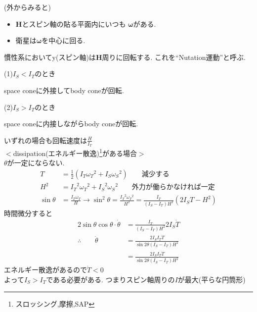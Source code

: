 \documentclass[class=article, crop=false, dvipdfmx]{standalone}
\begin{document}
\noindent
(外からみると)\\
\begin{center}

\end{center}

\begin{itemize}
\item $\bm{H}$とスピン軸の貼る平面内にいつも
$\bm{\omega}$がある.
\item 衛星は$\bm{\omega}$を中心に回る.
\end{itemize}
慣性系においてy(スピン軸)は$\bm{H}$周りに回転する.
これを``Nutation運動''と呼ぶ.

\begin{minipage}{0.45\linewidth}
(1)$I_S<I_T$のとき


\vspace{6mm}

space coneに外接してbody coneが回転.
\end{minipage}
\hfill
\begin{minipage}{0.45\linewidth}
(2)$I_S>I_T$のとき



space coneに内接しながらbody coneが回転.
\end{minipage}
\vspace{\baselineskip}

いずれの場合も回転速度は$\frac{H}{I_T}$
\\

\noindent
$<$dissipation(エネルギー散逸)\footnote{スロッシング,摩擦,SAP}がある場合$>$\\
$\theta$が一定にならない.
\begin{align}
T&=\frac{1}{2}(I_T{\omega_T}^2+I_S{\omega_S}^2)
\qquad \text{減少する}
\label{T}\\
H^2&=
{I_T}^2{\omega_T}^2+{I_S}^2{\omega_S}^2\qquad
\text{外力が働らかなければ一定}
\label{H}\\
\sin\theta&=\frac{I_T \omega_T}{H}\rightarrow
\sin^2\theta=\frac{{I_T}^2{\omega_T}^2}
{H^2}=\frac{I_T}{(I_S-I_T)H^2}(2I_ST-H^2)
\end{align}
時間微分すると
\begin{align}
2\sin\theta \cos\theta \cdot \dot{\theta}&=
\frac{I_T}{(I_S-I_T)H^2}2I_S\dot{T}\\
\therefore\qquad \dot{\theta}&=
\frac{2I_SI_T\dot{T}}{\sin2\theta(I_S-I_T)H^2}\\
&=\frac{2I_SI_T\dot{T}}{\sin2\theta(I_S-I_T)H^2}\end{align}
エネルギー散逸があるので$\dot{T}<0$\\
よって$I_S>I_T$である必要がある.
つまりスピン軸周りの$I$が最大(平らな円筒形)
\begin{center}

\end{center}
\end{document}

